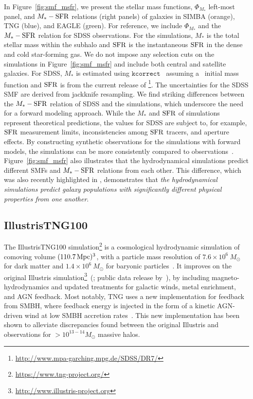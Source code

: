In Figure~\ref{fig:smf_msfr}, we present the stellar mass functions,
$\Phi_{M_*}$ left-most panel, and $M_*-{\rm SFR}$ relations (right panels) of
galaxies in SIMBA (orange), TNG (blue), and EAGLE (green). For reference, we
include $\Phi_{M_*}$ and the 
$M_*-{\rm SFR}$ relation for SDSS observations. For the simulations, $M_*$ is the
total stellar mass within the subhalo and ${\rm SFR}$ is the instantaneous ${\rm SFR}$ in the
dense and cold star-forming gas. 
We do not impose any selection cuts on the simulations in
Figure~\ref{fig:smf_msfr} and include both central and satellite galaxies. 
For SDSS, $M_*$ is estimated using $\mathtt{kcorrect}$~\citep{blanton2007a} 
assuming a~\cite{chabrier2003} initial mass function and ${\rm SFR}$ is from the
current release of \cite{brinchmann2004}\footnote{\url{http://www.mpa-garching.mpg.de/SDSS/DR7/}}.
The uncertainties for the SDSS SMF are derived from jackknife resampling.
We find striking differences between the $M_*-{\rm SFR}$ relation of SDSS and
the simulations, which underscore the need for a forward modeling approach.
While the $M_*$ and ${\rm SFR}$ of simulations represent theoretical
predictions, the values for SDSS are subject to, for example, ${\rm SFR}$
measurement limits, inconsistencies among ${\rm SFR}$ tracers, and aperture
effects.
By constructing synthetic observations for the simulations with forward
models, the simulations can be more consistently compared to
observations~\citep[see \eg][Starkenburg et al. in prep.]{dickey2020}.
Figure~\ref{fig:smf_msfr} also illustrates that the hydrodynamical simulations
predict different SMFs and $M_*-{\rm SFR}$ relations from each other.
This difference, which was also recently highlighted in \cite{hahn2019c},
demonstrates that \emph{the hydrodynamical simulations predict galaxy
populations with significantly different physical properties from one
another}.

\subsection{IllustrisTNG100} \label{sec:tng}
The IllustrisTNG100 simulation\footnote{\url{https://www.tng-project.org/}}
is a cosmological hydrodynamic simulation of comoving volume 
$(110.7\,{\rm Mpc})^3$, with a particle mass resolution of $7.6 \times 10^{6}\ M_\odot$ for dark matter and $1.4 \times 10^{6}\ M_\odot$ for baryonic particles~\citep{nelson2018, pillepich2018, springel2018, marinacci2018, naiman2018}. It improves on
the original Illustris simulation\footnote{\url{http://www.illustris-project.org}}~(\citealt{vogelsberger2014, genel2014};
public data release by~\citealt{nelson2015}), by including
magneto-hydrodynamics and updated treatments for galactic winds, metal
enrichment, and AGN feedback. Most notably, TNG uses a new implementation for
feedback from SMBH, where feedback energy is injected in the form of a kinetic
AGN-driven wind at low SMBH accretion rates~\citep{weinberger2018}. This new
implementation has been shown to alleviate discrepancies found between the
original Illustris and observations for $> 10^{13-14} M_\odot$ massive halos. 

